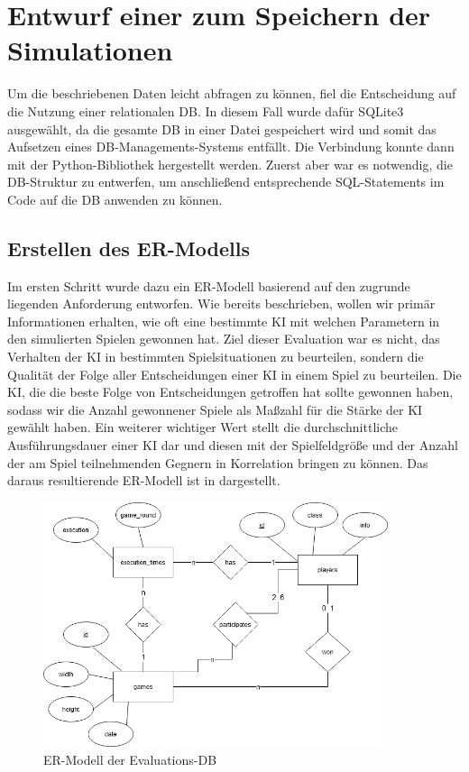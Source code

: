 \section{Entwurf einer  zum Speichern der Simulationen}
\label{sec:entwurf-datenbank}

Um die beschriebenen Daten leicht abfragen zu können, fiel die Entscheidung auf die Nutzung einer relationalen
\ac{DB}.
In diesem Fall wurde dafür SQLite3 ausgewählt, da die gesamte \ac{DB} in einer Datei gespeichert wird und somit das
Aufsetzen eines \acl{DB}-Managements-Systems entfällt. 
Die Verbindung konnte dann mit der Python-Bibliothek   hergestellt werden.
Zuerst aber war es notwendig, die \ac{DB}-Struktur zu entwerfen, um anschließend entsprechende SQL-Statements im Code
auf die \ac{DB} anwenden zu können.

\subsection{Erstellen des \acl{ER}-Modells}
\label{subsec:er-modell}

Im ersten Schritt wurde dazu ein \ac{ER}-Modell basierend auf den zugrunde liegenden Anforderung entworfen.
Wie bereits beschrieben, wollen wir primär Informationen erhalten, wie oft eine
bestimmte \ac{KI} mit welchen Parametern in den simulierten Spielen gewonnen hat.
Ziel dieser Evaluation war es nicht, das Verhalten der \ac{KI} in bestimmten Spielsituationen zu beurteilen,
sondern die Qualität der Folge aller Entscheidungen einer \ac{KI} in einem Spiel zu beurteilen.
Die \ac{KI}, die die beste Folge von Entscheidungen getroffen hat sollte gewonnen haben, sodass wir die Anzahl gewonnener Spiele als Maßzahl für die Stärke der \ac{KI} gewählt haben.
Ein weiterer wichtiger Wert stellt die durchschnittliche Ausführungsdauer einer \ac{KI} dar und diesen \ua
mit der Spielfeldgröße und der Anzahl der am Spiel teilnehmenden Gegnern in Korrelation bringen zu können.
Das daraus resultierende \ac{ER}-Modell ist in  dargestellt.

\begin{figure}[htb]
	\centering
	\includegraphics[width=0.9\textwidth]{Bilder/er-diagram.png}
	\caption{\ac{ER}-Modell der Evaluations-\ac{DB}}
	\label{fig:er-schema}
\end{figure}

